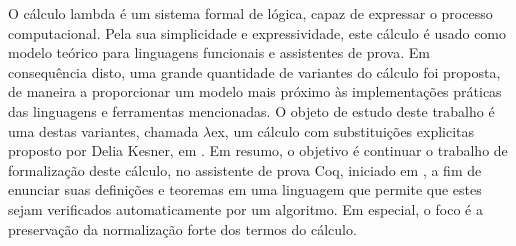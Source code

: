 O cálculo lambda é um sistema formal de lógica, capaz de expressar o processo computacional.
Pela sua simplicidade e expressividade, este cálculo é usado como modelo teórico
para linguagens funcionais e assistentes de prova. Em consequência disto, 
uma grande quantidade de variantes do cálculo foi proposta, de maneira a proporcionar
um modelo mais próximo às implementações práticas das linguagens e ferramentas mencionadas.
O objeto de estudo deste trabalho é uma destas variantes, chamada $\lambda$ex,
um cálculo com substituições explicitas proposto por Delia Kesner, em \cite{delia}.
Em resumo, o objetivo é continuar o trabalho de formalização
deste cálculo, no assistente de prova Coq, iniciado em \cite{initial}, a fim de enunciar suas definições e teoremas 
em uma linguagem que permite que estes sejam verificados automaticamente por um algoritmo.
Em especial, o foco é a preservação da normalização forte dos termos do cálculo.
